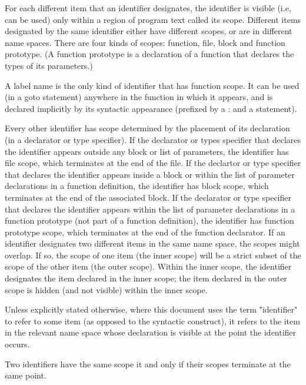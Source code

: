 \documentclass{article}
\begin{document}
For each different item that an identifier designates, the identifier is visible (i.e, 
can be used) only within a region of program text called its scope.  Different items 
designated by the same identifier either have different scopes, or are in different name
spaces. There are four kinds of scopes: function, file, block and function prototype.
(A function prototype is a declaration of a function that declares the types of its
parameters.)
\linebreak

A label name is the only kind of identifier that has function scope.  It can be used (in 
a goto statement) anywhere in the function in which it appears, and is declared
implicitly by its syntactic appearance (prefixed by a : and a statement).
\linebreak

Every other identifier has scope determined by the placement of its declaration (in a 
declarator or type specifier).  If the declarator or types specifier that declares the 
identifier appears outside any block or list of parameters, the identifier has file 
scope,  which terminates at the end of the file.  If the declartor or type specifier that
declares the identifier appears inside a block or within the list of parameter
declarations in a  function definition, the identifier has block scope, which terminates
at the end of the  associated block.  If the declarator or type specifier that declares 
the identifier appears  within the list of parameter declarations in a function prototype
(not part of a function definition), the identifier has function prototype scope, which 
terminates at the end of the function declarator.  If an identifier designates two 
different items in the same  name space, the scopes might overlap.  If so, the scope of 
one item (the inner scope) will be a strict subset of the scope of the other item (the 
outer scope). Within the inner scope, the identifier designates the item declared in the
inner scope; the item declared in the  outer scope is hidden (and not visible) within 
the inner scope.
\linebreak

Unless explicitly stated otherwise, where this document uses the term "identifier" to 
refer to some item (as opposed to the syntactic construct), it refers to the item in the 
relevant name space whose declaration is visible at the point the identifier occurs.
\linebreak

Two identifiers have the same scope it and only if their scopes terminate at the same 
point.
\linebreak
\end{document}
